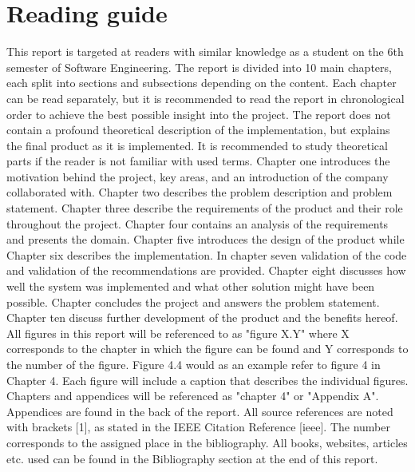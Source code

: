 
\chapter{Reading guide} %

\label{readingGuide} %


This report is targeted at readers with similar knowledge as a student on the 6th semester of
Software Engineering. The report
is divided into 10 main chapters, each split into sections and subsections depending on the content.
Each chapter can be read separately, but it is recommended to read the report in chronological order
to achieve the best possible insight into the project. The report does not contain a profound theoretical
description of the implementation, but explains the final product as it is implemented. It is
recommended to study theoretical parts if the reader is not familiar with used terms.
Chapter one introduces the motivation behind the project, key areas, and an introduction of the company collaborated with. Chapter two describes the problem description and problem statement. Chapter three describe the
requirements of the product and their role throughout the project. Chapter four contains an analysis
of the requirements and presents the domain. Chapter five introduces the design of the
product while Chapter six describes the implementation. In chapter seven validation of the code and validation of the recommendations are provided. Chapter eight discusses how well the system was implemented and what other solution might have been possible. Chapter concludes the project and answers the problem statement. Chapter ten discuss further development of the product and the benefits hereof.\\
All figures in this report will be referenced to as "figure X.Y" where X corresponds to the chapter in
which the figure can be found and Y corresponds to the number of the figure. Figure 4.4 would as an
example refer to figure 4 in Chapter 4. Each figure will include a caption that describes the individual
figures. Chapters and appendices will be referenced as "chapter 4" or "Appendix A". Appendices are found in the back of the report.
All source references are noted with brackets [1], as stated in the IEEE Citation Reference [ieee]. The number
corresponds to the assigned place in the bibliography. All books, websites, articles etc. used can be
found in the Bibliography section at the end of this report.